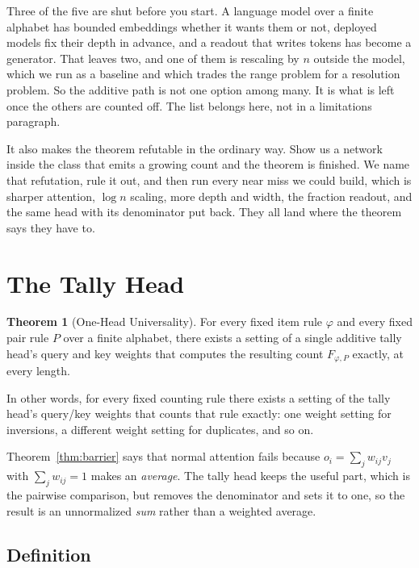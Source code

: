 \documentclass[10pt]{article}
\theoremstyle{definition}
\newtheorem{theorem}{Theorem}
\begin{document}
Three of the five are shut before you start. A language model over a finite
alphabet has bounded embeddings whether it wants them or not, deployed
models fix their depth in advance, and a readout that writes tokens has become a generator. That leaves two, and one of them is
rescaling by $n$ outside the model, which we run as a baseline and which
trades the range problem for a resolution problem. So the additive path is
not one option among many. It is what is left once the others are counted
off. The list belongs here, not in a limitations paragraph.

It also makes the theorem refutable in the ordinary way. Show us a network
inside the class that emits a growing count and the theorem is finished. We name that refutation, rule it out, and then run every near miss we could
build, which is sharper attention, $\log n$ scaling, more depth and width,
the fraction readout, and the same head with its denominator put back. They
all land where the theorem says they have to.

\section{The Tally Head}
\label{sec:tally}

\begin{theorem}[One-Head Universality]
\label{thm:universal}
For every fixed item rule $\varphi$ and every fixed pair rule $P$ over a
finite alphabet, there exists a setting of a single additive tally head's
query and key weights that computes the resulting count
$F_{\varphi,P}$ exactly, at every length.
\end{theorem}

In other words, for every fixed counting rule there exists a setting of the
tally head's query/key weights that counts that rule exactly: one weight
setting for inversions, a different weight setting for duplicates, and so
on.

Theorem~\ref{thm:barrier} says that normal attention fails because
$o_i = \sum_j w_{ij} v_j$ with $\sum_j w_{ij} = 1$ makes an
\emph{average}. The tally head keeps the useful part, which is the pairwise
comparison, but removes the denominator and sets it to one, so the
result is an unnormalized \emph{sum} rather than a weighted average.

\subsection{Definition}
\end{document}

